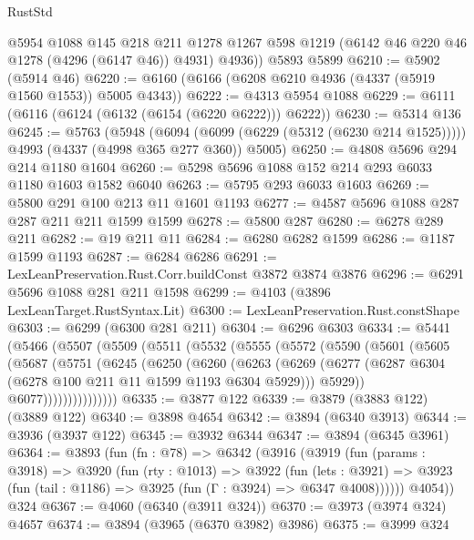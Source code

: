 \begin{lexlean}{RustStd}
\begin{coremodule}
        @5954
        @1088
        @145
        @218
        @211
        @1278
        @1267
        @598
        @1219
        (@6142 @46 @220 @46 @1278 (@4296 (@6147 @46)) @4931)
        @4936))
    @5893
    @5899
@6210 := @5902 (@5914 @46)
@6220 := @6160 (@6166 (@6208 @6210 @4936 (@4337 (@5919 @1560 @1553)) @5005 @4343))
@6222 := @4313 @5954 @1088
@6229 := @6111 (@6116 (@6124 (@6132 (@6154 (@6220 @6222))) @6222))
@6230 := @5314 @136
@6245 := @5763
    (@5948
      (@6094 (@6099 (@6229 (@5312 (@6230 @214 @1525)))))
      @4993
      (@4337 (@4998 @365 @277 @360))
      @5005)
@6250 := @4808 @5696 @294 @214 @1180 @1604
@6260 := @5298 @5696 @1088 @152 @214 @293 @6033 @1180 @1603 @1582 @6040
@6263 := @5795 @293 @6033 @1603
@6269 := @5800 @291 @100 @213 @11 @1601 @1193
@6277 := @4587 @5696 @1088 @287 @287 @211 @211 @1599 @1599
@6278 := @5800 @287
@6280 := @6278 @289 @211
@6282 := @19 @211 @11
@6284 := @6280 @6282 @1599
@6286 := @1187 @1599 @1193
@6287 := @6284 @6286
@6291 := LexLeanPreservation.Rust.Corr.buildConst @3872 @3874 @3876
@6296 := @6291 @5696 @1088 @281 @211 @1598
@6299 := @4103 (@3896 LexLeanTarget.RustSyntax.Lit)
@6300 := LexLeanPreservation.Rust.constShape
@6303 := @6299 (@6300 @281 @211)
@6304 := @6296 @6303
@6334 := @5441
    (@5466
      (@5507
        (@5509
          (@5511
            (@5532
              (@5555
                (@5572
                  (@5590
                    (@5601
                      (@5605
                        (@5687
                          (@5751
                            (@6245
                              (@6250
                                (@6260
                                  (@6263
                                    (@6269
                                      (@6277
                                        (@6287 @6304 (@6278 @100 @211 @11 @1599 @1193 @6304 @5929)))
                                      @5929))
                                  @6077)))))))))))))))
@6335 := @3877 @122
@6339 := @3879 (@3883 @122) (@3889 @122)
@6340 := @3898 @4654
@6342 := @3894 (@6340 @3913)
@6344 := @3936 (@3937 @122)
@6345 := @3932 @6344
@6347 := @3894 (@6345 @3961)
@6364 := @3893
    (fun (fn : @78) =>
    @6342
      (@3916
        (@3919
          (fun (params : @3918) =>
          @3920
            (fun (rty : @1013) =>
            @3922
              (fun (lets : @3921) =>
              @3923 (fun (tail : @1186) => @3925 (fun (Γ : @3924) => @6347 @4008))))))
        @4054))
    @324
@6367 := @4060 (@6340 (@3911 @324))
@6370 := @3973 (@3974 @324) @4657
@6374 := @3894 (@3965 (@6370 @3982) @3986)
@6375 := @3999 @324

\end{coremodule}
\end{lexlean}
